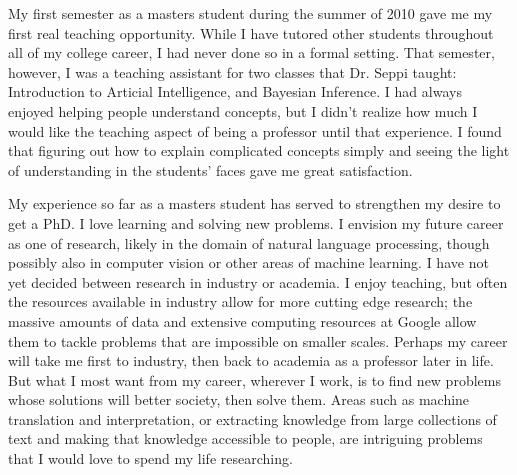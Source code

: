 \documentclass[onecolumn, 12pt]{article}
\begin{document}
My first semester as a masters student during the summer of 2010 gave me my
first real teaching opportunity.  While I have tutored other students
throughout all of my college career, I had never done so in a formal setting.
That semester, however, I was a teaching assistant for two classes that Dr.
Seppi taught: Introduction to Articial Intelligence, and Bayesian Inference.  I
had always enjoyed helping people understand concepts, but I didn't realize how
much I would like the teaching aspect of being a professor until that
experience.  I found that figuring out how to explain complicated concepts
simply and seeing the light of understanding in the students' faces gave me
great satisfaction.

My experience so far as a masters student has served to strengthen my desire to
get a PhD.  I love learning and solving new problems.  I envision my future
career as one of research, likely in the domain of natural language processing,
though possibly also in computer vision or other areas of machine learning.  I
have not yet decided between research in industry or academia.  I enjoy
teaching, but often the resources available in industry allow for more cutting
edge research; the massive amounts of data and extensive computing resources at
Google allow them to tackle problems that are impossible on smaller scales.
Perhaps my career will take me first to industry, then back to academia as a
professor later in life.  But what I most want from my career, wherever I work,
is to find new problems whose solutions will better society, then solve them.
Areas such as machine translation and interpretation, or extracting knowledge
from large collections of text and making that knowledge accessible to people,
are intriguing problems that I would love to spend my life researching.
\end{document}

